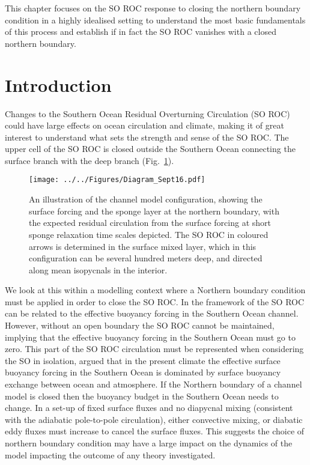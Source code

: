 \label{chap:2}


This chapter focuses on the SO ROC response to closing the northern boundary condition in a highly idealised setting to understand the most basic fundamentals of this process and establish if in fact the SO ROC vanishes with a closed northern boundary.

\section{Introduction}

Changes to the Southern Ocean Residual Overturning Circulation (SO ROC) could have large effects on ocean circulation and climate, making it of great interest to understand what sets the strength and sense of the SO ROC. The upper cell of the SO ROC is closed outside the Southern Ocean connecting the surface branch with the deep branch (Fig.~\ref{fig:BBschemandmodel}).

\begin{figure}
\noindent \texttt{[image: ../../Figures/Diagram\_Sept16.pdf]}
\caption{An illustration of the channel model configuration, showing the surface forcing and the sponge layer at the northern boundary, with the expected residual circulation from the surface forcing at short sponge relaxation time scales depicted. The SO ROC in coloured arrows is determined in the surface mixed layer, which in this configuration can be several hundred meters deep, and directed along mean isopycnals in the interior.}
\label{fig:BBschemandmodel}
\end{figure}

We look at this within a modelling context where a Northern boundary condition must be applied in order to close the SO ROC. In the framework of \cite{Marshall2003} the SO ROC can be related to the effective buoyancy forcing in the Southern Ocean channel. However, without an open boundary the SO ROC cannot be maintained, implying that the effective buoyancy forcing in the Southern Ocean must go to zero. This part of the SO ROC circulation must be represented when considering the SO in isolation, \citet{Marshall2003} argued that in the present climate the effective surface buoyancy forcing in the Southern Ocean is dominated by surface buoyancy exchange between ocean and atmosphere. If the Northern boundary of a channel model is closed then the buoyancy budget in the Southern Ocean needs to change. In a set-up of fixed surface fluxes and no diapycnal mixing (consistent with the adiabatic pole-to-pole circulation), either convective mixing, or diabatic eddy fluxes must increase to cancel the surface fluxes. This suggests the choice of northern boundary condition may have a large impact on the dynamics of the model impacting the outcome of any theory investigated. 

